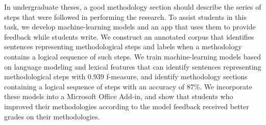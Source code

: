 In undergraduate theses, a good methodology section should describe the series of steps that were followed in performing the research. To assist students in this task, we develop machine-learning models and an app that uses them to provide feedback while students write. We construct an annotated corpus that identifies sentences representing methodological steps and labels when a methodology contains a logical sequence of such steps. We train machine-learning models based on language modeling and lexical features that can identify sentences representing methodological steps with 0.939 f-measure, and identify methodology sections containing a logical sequence of steps with an accuracy of 87\%. We incorporate these models into a Microsoft Office Add-in, and show that students who improved their methodologies according to the model feedback received better grades on their methodologies.
